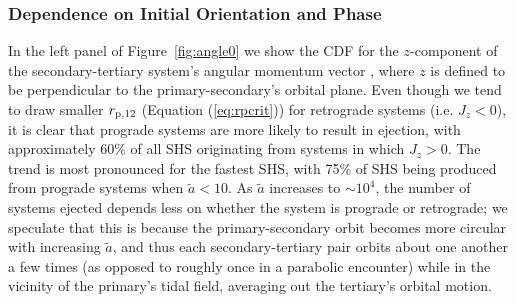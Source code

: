 \documentclass[a4paper,twocolumn]{emulateapj}
\begin{document}
{\subsubsection{Dependence on Initial Orientation and Phase}
In the left panel of Figure~\ref{fig:angle0} we show the CDF for the $z$-component of the secondary-tertiary system's angular momentum vector , where $z$ is defined to be perpendicular to the primary-secondary's orbital plane. Even though we tend to draw smaller $r_{\rm p,12}$ (Equation (\ref{eq:rpcrit})) for retrograde systems (i.e. $J_{z} < 0$), it is clear that prograde systems are more likely to result in ejection, with approximately 60\% of all SHS originating from systems in which $J_{z} > 0$. The trend is most pronounced for the fastest SHS, with 75\% of SHS being produced from prograde systems when $\tilde{a} < 10$. As $\tilde{a}$ increases to $\sim 10^{4}$, the number of systems ejected depends less on whether the system is prograde or retrograde; we speculate that this is because the primary-secondary orbit becomes more circular with increasing $\tilde{a}$, and thus each secondary-tertiary pair orbits about one another a few times (as opposed to roughly once in a parabolic encounter) while in the vicinity of the primary's tidal field, averaging out the tertiary's orbital motion.

}
\end{document}
